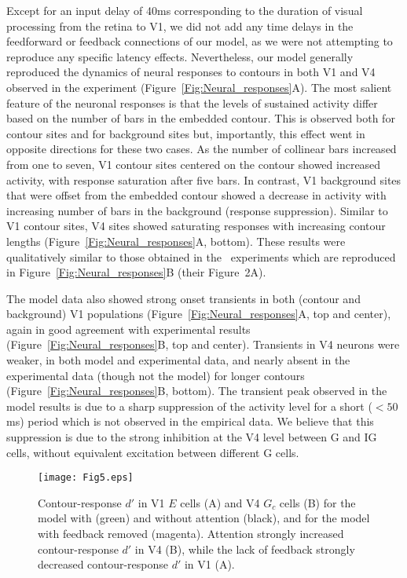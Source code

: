 Except for an input delay of 40ms corresponding to the duration of
visual processing from the retina to V1, we did not 
add any time delays in the feedforward or feedback connections of
our model, as we were not attempting to reproduce 
any specific latency effects.
Nevertheless, our model generally reproduced the dynamics of neural
responses to contours in both V1 and V4 observed in the
\cite{Chen_etal14} experiment (Figure~\ref{Fig:Neural_responses}A).
The most salient feature of the neuronal responses is that the levels
of sustained activity differ based on the number of bars in the
embedded contour. This is observed both for contour sites and for
background sites but, importantly, this effect went in opposite
directions for these two cases.  As the number of collinear bars
increased from one to seven, V1 contour sites centered on the contour
showed increased activity, with response saturation after five
bars. In contrast, V1 background sites that were offset from the
embedded contour showed a decrease in activity with increasing number
of bars in the background (response suppression). Similar to V1
contour sites, V4 sites showed saturating responses with increasing
contour lengths (Figure~\ref{Fig:Neural_responses}A, bottom).  These
results were qualitatively similar to those obtained in
the~\cite{Chen_etal14} experiments which are reproduced in
Figure~\ref{Fig:Neural_responses}B (their Figure~2A).

The model data also showed strong onset transients in both (contour
and background) V1 populations (Figure~\ref{Fig:Neural_responses}A,
top and center), again in good agreement with experimental results
(Figure~\ref{Fig:Neural_responses}B, top and center). Transients in V4
neurons were weaker, in both model and experimental data, and nearly
absent in the experimental data (though not the model) for longer
contours (Figure~\ref{Fig:Neural_responses}B, bottom).
The transient peak observed in the model results
is due to a sharp suppression of the activity level for a short
($<50$ms) period which is not observed in the empirical data. We
believe that this suppression is due to the  strong inhibition at the
V4 level between G and IG cells, without equivalent
excitation between different G cells.

\begin{figure*}
\begin{center}
\texttt{[image: Fig5.eps]}
\end{center}
\caption{Contour-response $d'$ in V1 $E$ cells (A) and V4 $G_c$ cells (B) for the model with (green) and without attention (black), and for the model with feedback removed 
(magenta). Attention strongly increased
  contour-response $d'$ in V4 (B), while the lack of feedback strongly
  decreased contour-response $d'$ in V1 (A).}
\label{Fig:FB_att}
\end{figure*}

